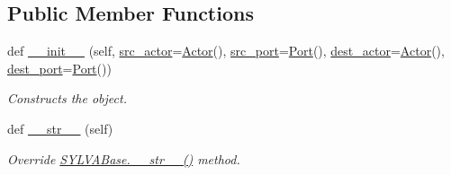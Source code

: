 \subsection*{Public Member Functions}
\begin{DoxyCompactItemize}
\item 
def \hyperlink{classsylva_1_1base_1_1sdf_1_1_edge_a6514d5bb661258682b4c8262b9631153}{\+\_\+\+\_\+init\+\_\+\+\_\+} (self, \hyperlink{classsylva_1_1base_1_1sdf_1_1_edge_a669757129f2efcb76625f90992afd7db}{src\+\_\+actor}=\hyperlink{classsylva_1_1base_1_1sdf_1_1_actor}{Actor}(), \hyperlink{classsylva_1_1base_1_1sdf_1_1_edge_a824af9d2da5c0fadcc08bba783a29f15}{src\+\_\+port}=\hyperlink{classsylva_1_1base_1_1sdf_1_1_port}{Port}(), \hyperlink{classsylva_1_1base_1_1sdf_1_1_edge_aaf76b434868a8237cd832dbd0a3a20f1}{dest\+\_\+actor}=\hyperlink{classsylva_1_1base_1_1sdf_1_1_actor}{Actor}(), \hyperlink{classsylva_1_1base_1_1sdf_1_1_edge_a9c5834c5e8234311f49654ced9c43424}{dest\+\_\+port}=\hyperlink{classsylva_1_1base_1_1sdf_1_1_port}{Port}())
\begin{DoxyCompactList}\small\item\em Constructs the object. \end{DoxyCompactList}\item 
def \hyperlink{classsylva_1_1base_1_1sdf_1_1_edge_a0e573f4c878817df6cf77283137df6d2}{\+\_\+\+\_\+str\+\_\+\+\_\+} (self)
\begin{DoxyCompactList}\small\item\em Override \hyperlink{classsylva_1_1base_1_1sylva__base_1_1_s_y_l_v_a_base_a6c1ed8e83c61ea8a6035b5e4460989f3}{S\+Y\+L\+V\+A\+Base.\+\_\+\+\_\+str\+\_\+\+\_\+()} method. \end{DoxyCompactList}\end{DoxyCompactItemize}
